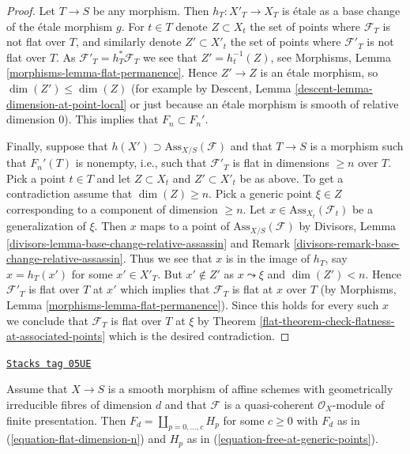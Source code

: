 \begin{proof}

Let $T \to S$ be any morphism. Then $h_T : X'_T \to X_T$ is \'etale as a
base change of the \'etale morphism $g$. For $t \in T$ denote
$Z \subset X_t$ the set of points where $\mathcal{F}_T$ is not
flat over $T$, and similarly denote $Z' \subset X'_t$ the set of
points where $\mathcal{F}'_T$ is not flat over $T$. As
$\mathcal{F}'_T = h_T^*\mathcal{F}_T$ we see that
$Z' = h_t^{-1}(Z)$, see
Morphisms, Lemma \ref{morphisms-lemma-flat-permanence}.
Hence $Z' \to Z$ is an \'etale morphism, so $\dim(Z') \leq \dim(Z)$
(for example by
Descent, Lemma \ref{descent-lemma-dimension-at-point-local}
or just because an \'etale morphism is smooth of relative dimension $0$).
This implies that $F_n \subset F_n'$.

\medskip\noindent
Finally, suppose that $h(X') \supset \text{Ass}_{X/S}(\mathcal{F})$
and that $T \to S$ is a morphism such that $F_n'(T)$ is nonempty, i.e.,
such that $\mathcal{F}'_T$ is flat in dimensions $\geq n$ over $T$.
Pick a point $t \in T$ and let $Z \subset X_t$ and $Z' \subset X'_t$
be as above. To get a contradiction assume that $\dim(Z) \geq n$.
Pick a generic point $\xi \in Z$ corresponding to a component
of dimension $\geq n$. Let $x \in \text{Ass}_{X_t}(\mathcal{F}_t)$
be a generalization of $\xi$. Then $x$ maps to a point of
$\text{Ass}_{X/S}(\mathcal{F})$ by
Divisors, Lemma \ref{divisors-lemma-base-change-relative-assassin} and
Remark \ref{divisors-remark-base-change-relative-assassin}.
Thus we see that $x$ is in the image of $h_T$, say
$x = h_T(x')$ for some $x' \in X'_T$. But $x' \not \in Z'$
as $x \leadsto \xi$ and $\dim(Z') < n$. Hence $\mathcal{F}'_T$
is flat over $T$ at $x'$ which implies that $\mathcal{F}_T$ is flat
at $x$ over $T$ (by
Morphisms, Lemma \ref{morphisms-lemma-flat-permanence}).
Since this holds for every such $x$ we conclude
that $\mathcal{F}_T$ is flat over $T$ at $\xi$ by
Theorem \ref{flat-theorem-check-flatness-at-associated-points}
which is the desired contradiction.
\end{proof}

\begin{lemma}[Compare H F]
\label{flat-lemma-compare-H-F}
\href{https://stacks.math.columbia.edu/tag/05UE}{\texttt{Stacks tag 05UE}}

Assume that $X \to S$ is a smooth morphism of affine schemes
with geometrically irreducible fibres of dimension $d$ and that
$\mathcal{F}$ is a quasi-coherent $\mathcal{O}_X$-module of finite
presentation. Then $F_d = \coprod_{p = 0, \ldots, c} H_p$
for some $c \geq 0$ with $F_d$ as in
(\ref{equation-flat-dimension-n}) and $H_p$ as in
(\ref{equation-free-at-generic-points}).
\end{lemma}


